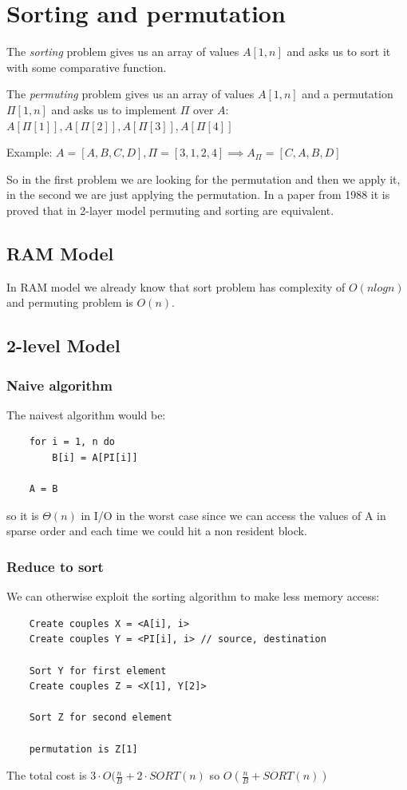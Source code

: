 \section{Sorting and permutation}

The \emph{sorting} problem gives us an array of values $A[1, n]$ and asks us to sort it with some comparative function.

The \emph{permuting} problem gives us an array of values $A[1, n]$ and a permutation $\Pi[1, n]$ and asks us to implement $\Pi$ over $A$: $A[\Pi[1]], A[\Pi[2]], A[\Pi[3]], A[\Pi[4]]$

Example: $A = [A,B,C,D], \Pi=[3, 1, 2, 4] \implies A_{\Pi} = [C, A, B, D]$

So in the first problem we are looking for the permutation and then we apply it, in the second we are just applying the permutation.
In a paper from 1988 it is proved that in 2-layer model permuting and sorting are equivalent.

\subsection{RAM Model}
In RAM model we already know that sort problem has complexity of $O(nlogn)$ and permuting problem is $O(n)$.

\subsection{2-level Model}
\subsubsection{Naive algorithm}
The naivest algorithm would be:
\begin{verbatim}
    for i = 1, n do
        B[i] = A[PI[i]]
        
    A = B
\end{verbatim}
so it is $\Theta(n)$ in I/O in the worst case since we can access the values of A in sparse order and each time we could hit a non resident block.

\subsubsection{Reduce to sort}
We can otherwise exploit the sorting algorithm to make less memory access:
\begin{verbatim}
    Create couples X = <A[i], i>
    Create couples Y = <PI[i], i> // source, destination

    Sort Y for first element
    Create couples Z = <X[1], Y[2]>

    Sort Z for second element
    
    permutation is Z[1]
\end{verbatim}
The total cost is $3 \cdot O(\frac{n}{B} + 2 \cdot SORT(n)$ so $O(\frac{n}{B} + SORT(n))$

